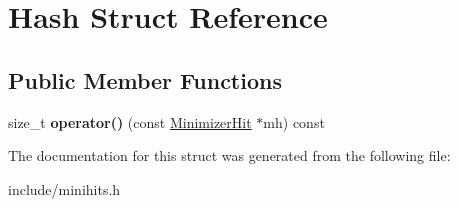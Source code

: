 \hypertarget{structHash}{}\section{Hash Struct Reference}
\label{structHash}
\subsection*{Public Member Functions}
\begin{DoxyCompactItemize}
\item 
\mbox{\label{structHash_a9c93ad1ee76bbef90dd3e934f6937a64}} 
size\+\_\+t {\bfseries operator()} (const \hyperlink{structMinimizerHit}{Minimizer\+Hit} $\ast$mh) const
\end{DoxyCompactItemize}


The documentation for this struct was generated from the following file\+:\begin{DoxyCompactItemize}
\item 
include/minihits.\+h\end{DoxyCompactItemize}
